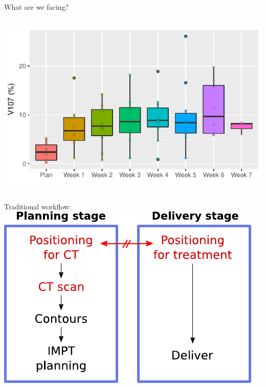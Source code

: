 \begin{frame}[c]{What are we facing?}
\begin{columns}[c]
        \includegraphics[width=\textwidth]{imgs/plan_evolution_V107.pdf}
    \end{columns}
\end{frame}

\begin{frame}[c]{Traditional workflow:}
    \includegraphics[scale=0.86]{imgs/workflow_trad_2.pdf}
\end{frame}

